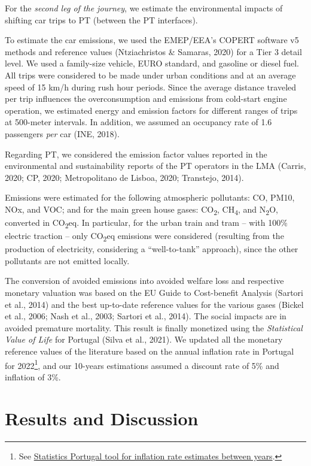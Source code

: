 \documentclass[review, doubleblind, 3p,
authoryear]{elsarticle} %
\begin{document}
For the \emph{second leg of the journey}, we estimate the environmental
impacts of shifting car trips to PT (between the PT interfaces).

To estimate the car emissions, we used the EMEP/EEA's COPERT software v5
methods and reference values (Ntziachristos \& Samaras, 2020) for a Tier
3 detail level. We used a family-size vehicle, EURO standard, and
gasoline or diesel fuel. All trips were considered to be made under
urban conditions and at an average speed of 15 km/h during rush hour
periods. Since the average distance traveled per trip influences the
overconsumption and emissions from cold-start engine operation, we
estimated energy and emission factors for different ranges of trips at
500-meter intervals. In addition, we assumed an occupancy rate of 1.6
passengers \emph{per} car (INE, 2018).

Regarding PT, we considered the emission factor values reported in the
environmental and sustainability reports of the PT operators in the LMA
(Carris, 2020; CP, 2020; Metropolitano de Lisboa, 2020; Transtejo,
2014).

Emissions were estimated for the following atmospheric pollutants: CO,
PM10, NOx, and VOC; and for the main green house gases:
CO\textsubscript{2}, CH\textsubscript{4}, and N\textsubscript{2}O,
converted in CO\textsubscript{2}eq. In particular, for the urban train
and tram -- with 100\% electric traction -- only CO\textsubscript{2}eq
emissions were considered (resulting from the production of electricity,
considering a ``well-to-tank'' approach), since the other pollutants are
not emitted locally.

The conversion of avoided emissions into avoided welfare loss and
respective monetary valuation was based on the EU Guide to Cost-benefit
Analysis (Sartori et al., 2014) and the best up-to-date reference values
for the various gases (Bickel et al., 2006; Nash et al., 2003; Sartori
et al., 2014). The social impacts are in avoided premature mortality.
This result is finally monetized using the \emph{Statistical Value of
Life} for Portugal (Silva et al., 2021). We updated all the monetary
reference values of the literature based on the annual inflation rate in
Portugal for 2022\footnote{See
  \href{https://www.ine.pt/xportal/xmain?xpid=INE\&xpgid=ipc}{Statistics
  Portugal tool for inflation rate estimates between years}.}, and our
10-years estimations assumed a discount rate of 5\% and inflation of
3\%.

\hypertarget{results-and-discussion}{%
\section{Results and Discussion}\label{results-and-discussion}}
\end{document}
